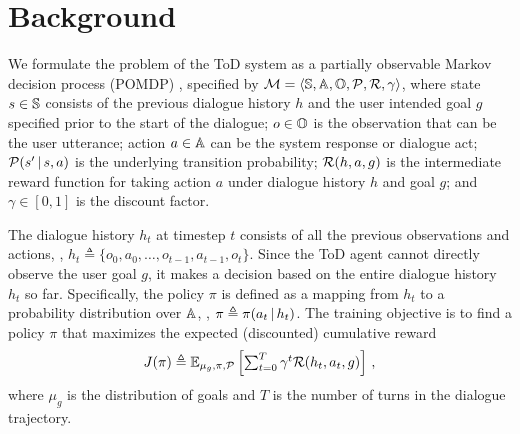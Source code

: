 \vspace{-.2em}
\section{Background} \label{sec:background}
\vspace{-.2em}
%

 \label{sec:tod_rl}
We formulate the problem of the ToD system as a partially observable Markov decision process (POMDP) \citep{kaelbling1998planning}, 
specified by ${\mathcal{M}} = \langle {\mathbb{S}}, {\mathbb{A}}, {\mathbb{O}}, {\mathcal{P}}, {\mathcal{R}}, \gamma\rangle $, where state $s \in {\mathbb{S}}$ consists of the previous dialogue history $h$ and the user intended goal $g$ specified prior to the start of the dialogue; 
$o \in {\mathbb{O}}$ is the observation that can be the user utterance; action $a \in {\mathbb{A}}$ can be the system response or dialogue act; %
${\mathcal{P}}(s^\prime \,|\, s, a)$ is the underlying transition probability; 
${\mathcal{R}}(h, a, g)$ is the intermediate reward function for taking action $a$ under dialogue history $h$  and goal $g$; and $\gamma \in [0, 1]$ is the discount factor.

The dialogue history $h_t$ at timestep $t$ consists of all the previous observations and actions, \ie, $h_t \triangleq \{o_0, a_0,\ldots, o_{t-1}, a_{t-1}, o_t\}$. 
Since the ToD agent cannot directly observe the user goal $g$, it makes a decision based on the entire dialogue history $h_t$ so far.
Specifically, the policy $\pi$ is defined as a mapping from $h_t$ to a probability distribution over ${\mathbb{A}}$, \ie, $\pi \triangleq \pi(a_t \,|\, h_t)$.
The training objective is to find a policy $\pi$ that maximizes the expected (discounted) cumulative reward
\begin{align*}\textstyle
    J(\pi) \triangleq \mathbb{E}_{\mu_{g}, \pi, {\mathcal{P}}}\left[\sum_{t=0}^{T}\gamma^t {\mathcal{R}}(h_t, a_t, g)\right]\,,
\end{align*}
where $\mu_{g}$ is the distribution of goals and $T$ is the number of turns in the dialogue trajectory.


